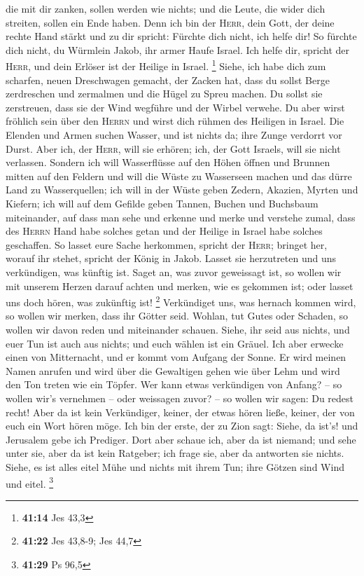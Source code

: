 die mit dir zanken, sollen werden wie nichts; und die Leute, die wider
dich streiten, sollen ein Ende haben.  Denn ich bin der
\textsc{Herr}, dein Gott, der deine rechte Hand stärkt und zu dir
spricht: Fürchte dich nicht, ich helfe dir!  So fürchte
dich nicht, du Würmlein Jakob, ihr armer Haufe Israel. Ich helfe dir,
spricht der \textsc{Herr}, und dein Erlöser ist der Heilige in Israel.
\footnote{\textbf{41:14} Jes 43,3}  Siehe, ich habe dich
zum scharfen, neuen Dreschwagen gemacht, der Zacken hat, dass du sollst
Berge zerdreschen und zermalmen und die Hügel zu Spreu machen.
 Du sollst sie zerstreuen, dass sie der Wind wegführe und
der Wirbel verwehe. Du aber wirst fröhlich sein über den \textsc{Herrn}
und wirst dich rühmen des Heiligen in Israel.  Die
Elenden und Armen suchen Wasser, und ist nichts da; ihre Zunge verdorrt
vor Durst. Aber ich, der \textsc{Herr}, will sie erhören; ich, der Gott
Israels, will sie nicht verlassen.  Sondern ich will
Wasserflüsse auf den Höhen öffnen und Brunnen mitten auf den Feldern und
will die Wüste zu Wasserseen machen und das dürre Land zu Wasserquellen;
 ich will in der Wüste geben Zedern, Akazien, Myrten und
Kiefern; ich will auf dem Gefilde geben Tannen, Buchen und Buchsbaum
miteinander,  auf dass man sehe und erkenne und merke und
verstehe zumal, dass des \textsc{Herrn} Hand habe solches getan und der
Heilige in Israel habe solches geschaffen.  So lasset
eure Sache herkommen, spricht der \textsc{Herr}; bringet her, worauf ihr
stehet, spricht der König in Jakob.  Lasset sie
herzutreten und uns verkündigen, was künftig ist. Saget an, was zuvor
geweissagt ist, so wollen wir mit unserem Herzen darauf achten und
merken, wie es gekommen ist; oder lasset uns doch hören, was zukünftig
ist! \footnote{\textbf{41:22} Jes 43,8-9; Jes 44,7} 
Verkündiget uns, was hernach kommen wird, so wollen wir merken, dass ihr
Götter seid. Wohlan, tut Gutes oder Schaden, so wollen wir davon reden
und miteinander schauen.  Siehe, ihr seid aus nichts, und
euer Tun ist auch aus nichts; und euch wählen ist ein Gräuel.
 Ich aber erwecke einen von Mitternacht, und er kommt vom
Aufgang der Sonne. Er wird meinen Namen anrufen und wird über die
Gewaltigen gehen wie über Lehm und wird den Ton treten wie ein Töpfer.
 Wer kann etwas verkündigen von Anfang? -- so wollen
wir's vernehmen -- oder weissagen zuvor? -- so wollen wir sagen: Du
redest recht! Aber da ist kein Verkündiger, keiner, der etwas hören
ließe, keiner, der von euch ein Wort hören möge.  Ich bin
der erste, der zu Zion sagt: Siehe, da ist's! und Jerusalem gebe ich
Prediger.  Dort aber schaue ich, aber da ist niemand; und
sehe unter sie, aber da ist kein Ratgeber; ich frage sie, aber da
antworten sie nichts.  Siehe, es ist alles eitel Mühe und
nichts mit ihrem Tun; ihre Götzen sind Wind und eitel. \footnote{\textbf{41:29}
  Ps 96,5}

